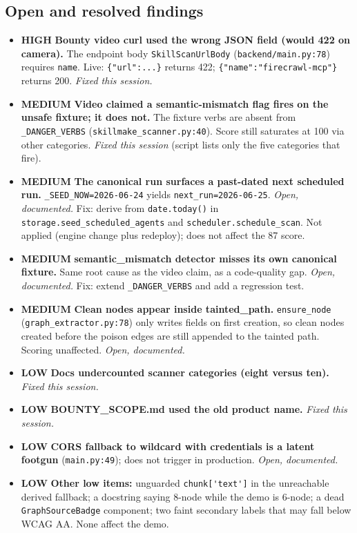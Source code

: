 \documentclass[11pt]{article}
\newcommand{\sevHIGH}{\textcolor{high}{\textbf{HIGH}}}
\newcommand{\sevMED}{\textcolor{med}{\textbf{MEDIUM}}}
\newcommand{\sevLOW}{\textcolor{low}{\textbf{LOW}}}
\newcommand{\code}[1]{\lstinline[style=inlinecode]|#1|}
\begin{document}
\subsection{Open and resolved findings}
\begin{itemize}
\item \sevHIGH{} \textbf{Bounty video curl used the wrong JSON field (would 422 on camera).} The endpoint body \code{SkillScanUrlBody} (\code{backend/main.py:78}) requires \code{name}. Live: \code{{"url":...}} returns 422; \code{{"name":"firecrawl-mcp"}} returns 200. \textit{Fixed this session.}
\item \sevMED{} \textbf{Video claimed a semantic-mismatch flag fires on the unsafe fixture; it does not.} The fixture verbs are absent from \code{_DANGER_VERBS} (\code{skillmake_scanner.py:40}). Score still saturates at 100 via other categories. \textit{Fixed this session} (script lists only the five categories that fire).
\item \sevMED{} \textbf{The canonical run surfaces a past-dated next scheduled run.} \code{_SEED_NOW=2026-06-24} yields \code{next_run=2026-06-25}. \textit{Open, documented.} Fix: derive from \code{date.today()} in \code{storage.seed_scheduled_agents} and \code{scheduler.schedule_scan}. Not applied (engine change plus redeploy); does not affect the 87 score.
\item \sevMED{} \textbf{semantic\_mismatch detector misses its own canonical fixture.} Same root cause as the video claim, as a code-quality gap. \textit{Open, documented.} Fix: extend \code{_DANGER_VERBS} and add a regression test.
\item \sevMED{} \textbf{Clean nodes appear inside tainted\_path.} \code{ensure_node} (\code{graph_extractor.py:78}) only writes fields on first creation, so clean nodes created before the poison edges are still appended to the tainted path. Scoring unaffected. \textit{Open, documented.}
\item \sevLOW{} \textbf{Docs undercounted scanner categories (eight versus ten).} \textit{Fixed this session.}
\item \sevLOW{} \textbf{BOUNTY\_SCOPE.md used the old product name.} \textit{Fixed this session.}
\item \sevLOW{} \textbf{CORS fallback to wildcard with credentials is a latent footgun} (\code{main.py:49}); does not trigger in production. \textit{Open, documented.}
\item \sevLOW{} \textbf{Other low items:} unguarded \code{chunk['text']} in the unreachable derived fallback; a docstring saying 8-node while the demo is 6-node; a dead \code{GraphSourceBadge} component; two faint secondary labels that may fall below WCAG AA. None affect the demo.
\end{itemize}
\end{document}
